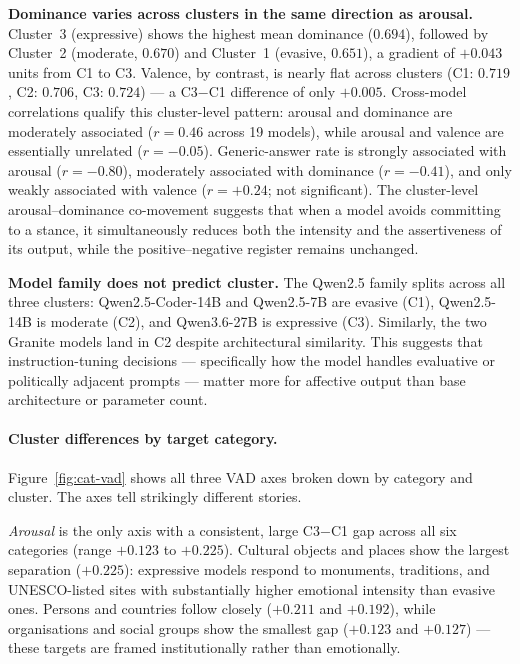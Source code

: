 \documentclass[runningheads,a4paper]{llncs}
\begin{document}
\textbf{Dominance varies across clusters in the same direction as arousal.}
Cluster~3 (expressive) shows the highest mean dominance ($0.694$),
followed by Cluster~2 (moderate, $0.670$) and Cluster~1 (evasive, $0.651$),
a gradient of $+0.043$ units from C1 to C3.
Valence, by contrast, is nearly flat across clusters
(C1: $0.719$, C2: $0.706$, C3: $0.724$) --- a C3$-$C1 difference of only $+0.005$.
Cross-model correlations qualify this cluster-level pattern: arousal and dominance
are moderately associated ($r = 0.46$ across 19 models), while arousal and valence
are essentially unrelated ($r = -0.05$).
Generic-answer rate is strongly associated with arousal ($r = -0.80$), moderately
associated with dominance ($r = -0.41$), and only weakly associated with valence
($r = +0.24$; not significant).
The cluster-level arousal--dominance co-movement suggests that when a model avoids committing
to a stance, it simultaneously reduces both the intensity and the assertiveness of
its output, while the positive--negative register remains unchanged.

\textbf{Model family does not predict cluster.}
The Qwen2.5 family splits across all three clusters:
Qwen2.5-Coder-14B and Qwen2.5-7B are evasive (C1), Qwen2.5-14B is moderate (C2),
and Qwen3.6-27B is expressive (C3).
Similarly, the two Granite models land in C2 despite architectural similarity.
This suggests that instruction-tuning decisions --- specifically how the model
handles evaluative or politically adjacent prompts --- matter more for affective
output than base architecture or parameter count.

\paragraph{Cluster differences by target category.}
Figure~\ref{fig:cat-vad} shows all three VAD axes broken down by category and cluster.
The axes tell strikingly different stories.

\emph{Arousal} is the only axis with a consistent, large C3$-$C1 gap across all six
categories (range $+0.123$ to $+0.225$).
Cultural objects and places show the largest separation ($+0.225$):
expressive models respond to monuments, traditions, and UNESCO-listed sites with
substantially higher emotional intensity than evasive ones.
Persons and countries follow closely ($+0.211$ and $+0.192$), while organisations
and social groups show the smallest gap ($+0.123$ and $+0.127$) --- these targets
are framed institutionally rather than emotionally.
\end{document}
